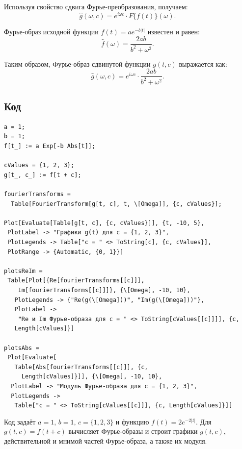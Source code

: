 \documentclass[a4paper,12pt]{article}
\begin{document}
Используя свойство сдвига Фурье-преобразования, получаем:
\[
\hat{g}(\omega, c) = e^{i \omega c} \cdot {F}\{f(t)\}(\omega).
\]

Фурье-образ исходной функции \( f(t) = a e^{-b |t|} \) известен и равен:
\[
\hat{f}(\omega) = \frac{2a b}{b^2 + \omega^2}.
\]

Таким образом, Фурье-образ сдвинутой функции \( g(t, c) \) выражается как:
\[
\hat{g}(\omega, c) = e^{i \omega c} \cdot \frac{2a b}{b^2 + \omega^2}.
\]






















\subsection{Код}
\begin{lstlisting}
a = 1;
b = 1;
f[t_] := a Exp[-b Abs[t]];

cValues = {1, 2, 3};
g[t_, c_] := f[t + c];

fourierTransforms = 
  Table[FourierTransform[g[t, c], t, \[Omega]], {c, cValues}];

Plot[Evaluate[Table[g[t, c], {c, cValues}]], {t, -10, 5}, 
 PlotLabel -> "Графики g(t) для c = {1, 2, 3}", 
 PlotLegends -> Table["c = " <> ToString[c], {c, cValues}], 
 PlotRange -> {Automatic, {0, 1}}]

plotsReIm = 
 Table[Plot[{Re[fourierTransforms[[c]]], 
    Im[fourierTransforms[[c]]]}, {\[Omega], -10, 10}, 
   PlotLegends -> {"Re(g(\[Omega]))", "Im(g(\[Omega]))"}, 
   PlotLabel -> 
    "Re и Im Фурье-образа для c = " <> ToString[cValues[[c]]]], {c, 
   Length[cValues]}]

plotsAbs = 
 Plot[Evaluate[
   Table[Abs[fourierTransforms[[c]]], {c, 
     Length[cValues]}]], {\[Omega], -10, 10}, 
  PlotLabel -> "Модуль Фурье-образа для c = {1, 2, 3}", 
  PlotLegends -> 
   Table["c = " <> ToString[cValues[[c]]], {c, Length[cValues]}]]
\end{lstlisting}

Код задаёт \( a = 1 \), \( b = 1 \), \( c = \{1, 2, 3\} \) и функцию \( f(t) = 2e^{-2|t|} \). Для \( g(t, c) = f(t + c) \) вычисляет Фурье-образы и строит графики \( g(t, c) \), действительной и мнимой частей Фурье-образа, а также их модуля.
\end{document}
